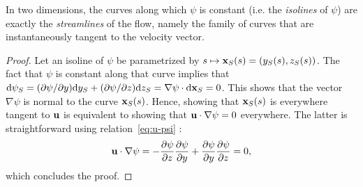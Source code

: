 \begin{property} \label{prop:streamfunction-tangent}
	In two dimensions, the curves along which $\psi$ is constant (i.e. the \textit{isolines} of  $\psi$) are exactly the \textit{streamlines} of the flow, namely the family of curves that are instantaneously tangent to the velocity vector.
\end{property}
\begin{proof}
	Let an isoline of $\psi$ be parametrized by $s \mapsto \mathbf x_S(s) = (y_S(s),z_S(s))$. The fact that $\psi$ is constant along that curve implies that $\mathrm d\psi_S = (\partial \psi/\partial y)\mathrm dy_S + (\partial \psi/\partial z) \mathrm dz_S = \nabla \psi \cdot \mathrm d \mathbf x_S = 0$. This shows that the vector $\nabla \psi$ is normal to the curve $\mathbf x_S(s)$. Hence, showing that $\mathbf x_S(s)$ is everywhere tangent to $\mathbf u$ is equivalent to showing that $\mathbf u \cdot \nabla \psi = 0$ everywhere. The latter is straightforward using relation~\eqref{eq:u-psi} :
\begin{equation}
	\mathbf u \cdot \nabla \psi = -\frac{\partial \psi}{\partial z}\frac{\partial \psi}{\partial y} + \frac{\partial \psi}{\partial y}\frac{\partial \psi}{\partial z} = 0,
\end{equation}
which concludes the proof.
\end{proof}

